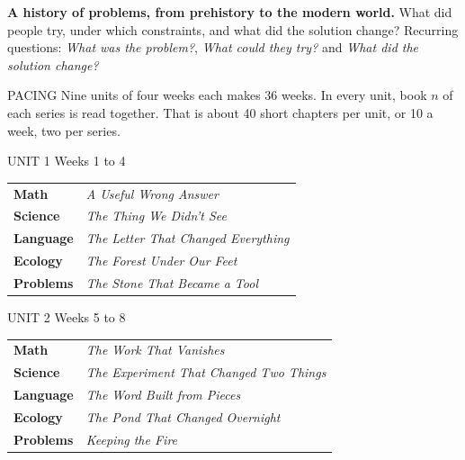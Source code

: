 \documentclass[10.5pt]{article}
\begin{document}
\textbf{A history of problems, from prehistory to the modern world.} What did people try, under which constraints, and what did the solution change? Recurring questions: \textit{What was the problem?}, \textit{What could they try?} and \textit{What did the solution change?}

\newpage
{}

\begin{tally}[hudgreen]{PACING}
Nine units of four weeks each makes 36 weeks. In every unit, book $n$ of each series is read together. That is about 40 short chapters per unit, or 10 a week, two per series.
\end{tally}

\begin{unitbox}{UNIT 1 \quad Weeks 1 to 4}
\begin{tabular}{@{}p{1.3in}p{2.5in}@{}}
\textcolor{hudorange}{\textbf{Math}} & \textit{A Useful Wrong Answer}\\
\textcolor{hudorange}{\textbf{Science}} & \textit{The Thing We Didn't See}\\
\textcolor{hudorange}{\textbf{Language}} & \textit{The Letter That Changed Everything}\\
\textcolor{hudorange}{\textbf{Ecology}} & \textit{The Forest Under Our Feet}\\
\textcolor{hudorange}{\textbf{Problems}} & \textit{The Stone That Became a Tool}\\
\end{tabular}
\end{unitbox}

\begin{unitbox}{UNIT 2 \quad Weeks 5 to 8}
\begin{tabular}{@{}p{1.3in}p{2.5in}@{}}
\textcolor{hudorange}{\textbf{Math}} & \textit{The Work That Vanishes}\\
\textcolor{hudorange}{\textbf{Science}} & \textit{The Experiment That Changed Two Things}\\
\textcolor{hudorange}{\textbf{Language}} & \textit{The Word Built from Pieces}\\
\textcolor{hudorange}{\textbf{Ecology}} & \textit{The Pond That Changed Overnight}\\
\textcolor{hudorange}{\textbf{Problems}} & \textit{Keeping the Fire}\\
\end{tabular}
\end{unitbox}
\end{document}
